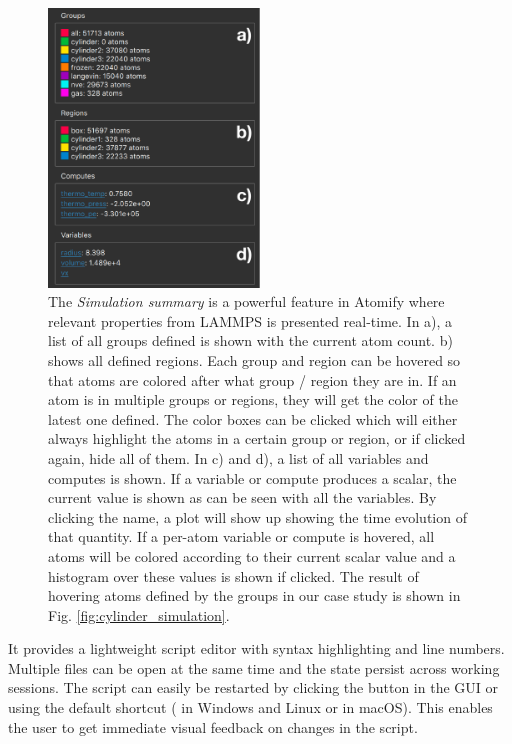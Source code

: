 \documentclass[aps,pre,twocolumn,letterpaper,floatfix,nofootinbib]{revtex4}
\begin{document}
\begin{figure}
	\centering
	\includegraphics[width=0.5\textwidth]{figures/rightbar.pdf}
	\caption{
		The \textit{Simulation summary} is a powerful feature in Atomify where relevant
		properties from LAMMPS is presented real-time.
		In a), a list of all groups defined is shown with the current atom count.
		b) shows all defined regions. Each group and region can be hovered so that atoms
		are colored after what group / region they are in. If an atom is in multiple
		groups or regions, they will get the color of the latest one defined.
		The color boxes can be clicked which will either always highlight the atoms in a certain group or region,
		or if clicked again, hide all of them.
		In c) and d), a list of all variables and computes is shown. If a variable or compute
		produces a scalar, the current value is shown as can be seen with all the variables.
		By clicking the name, a plot will show up showing the time evolution of that quantity.
		If a per-atom variable or compute is hovered, all atoms will be colored according to their
		current scalar value and a histogram over these values is shown if clicked.
		The result of hovering atoms defined by the groups in our case study is shown in Fig. \ref{fig:cylinder_simulation}.
    }
	\label{fig:rightbar}
\end{figure}


It provides a lightweight script editor with syntax highlighting and line numbers.
Multiple files can be open at the same time and the state persist across working sessions.
The script can easily be restarted by clicking the button in the GUI or using
the default shortcut ( in Windows and Linux or  in macOS).
This enables the user to get immediate visual feedback on changes in the script.
\end{document}
